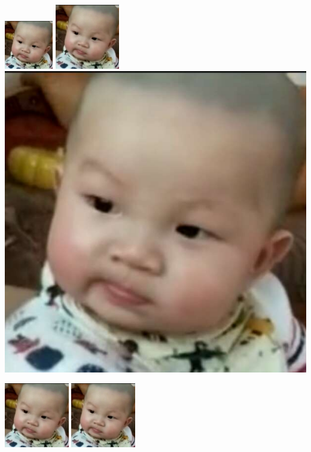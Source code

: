 \documentclass[12pt]{article}
\begin{document}
    \includegraphics[width=60pt]{baby.jpg}  %
    \includegraphics[width=80pt]{baby.jpg}
    \includegraphics[scale=0.2]{baby.jpg}
    \includegraphics[width=80pt,height=100pt]{baby.jpg}    \includegraphics[width=80pt,height=100pt,keepaspectratio]{baby.jpg} %
\end{document}
